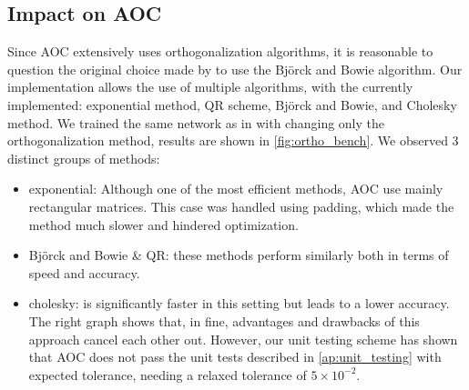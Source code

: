 
    \subsection{Impact on AOC}

    Since AOC extensively uses orthogonalization algorithms, it is reasonable to question the original choice made by \cite{li_preventing_2019, serrurier_explainable_nodate} to use the Björck and Bowie algorithm. Our implementation allows the use of multiple algorithms, with the currently implemented: exponential method, QR scheme, Björck and Bowie, and Cholesky method. We trained the same network as in \cite{li_preventing_2019} with changing only the orthogonalization method, results are shown in \cref{fig:ortho_bench}. We observed 3 distinct groups of methods:
    \begin{itemize}
        \item exponential: Although one of the most efficient methods, AOC use mainly rectangular matrices. This case was handled using padding, which made the method much slower and hindered optimization.
        \item Björck and Bowie \& QR: these methods perform similarly both in terms of speed and accuracy.
        \item cholesky: is significantly faster in this setting but leads to a lower accuracy. The right graph shows that, in fine, advantages and drawbacks of this approach cancel each other out. However, our unit testing scheme has shown that AOC does not pass the unit tests described in  \cref{ap:unit_testing} with expected tolerance, needing a relaxed tolerance of $5\times 10^{-2}$.
    \end{itemize}
    
